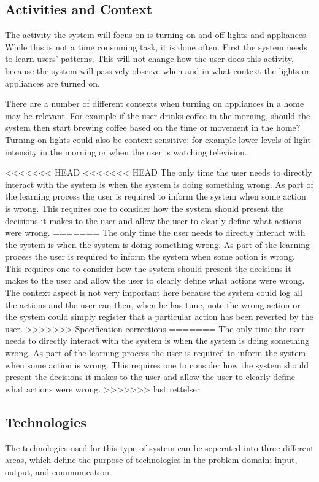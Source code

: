 \subsection{Activities and Context}
The activity the system will focus on is turning on and off lights and
appliances. While this is not a time consuming task, it is done often. First the
system needs to learn users' patterns. This will not change how the user does
this activity, because the system will passively observe when and in what
context the lights or appliances are turned on.

There are a number of different
contexts when turning on appliances in a home may be relevant.
For example if the user drinks coffee in the morning, should the system then
start brewing coffee based on the time or movement in the home? Turning on
lights could also be context sensitive; for example lower levels of light
intensity in the morning or when the user is watching television.

<<<<<<< HEAD
<<<<<<< HEAD
The only time the user needs to directly interact with the system is when the system is doing something wrong. As part of the learning process the user is required to inform the system when some action is wrong. This requires one to consider how the system should present the decisions it makes to the user and allow the user to clearly define what actions were wrong.
=======
The only time the user needs to directly interact with the system is when the system is doing something wrong. As part of the learning process the user is required to inform the system when some action is wrong. This requires one to consider how the system should present the decisions it makes to the user and allow the user to clearly define what actions were wrong. The context aspect is not very important here because the system could log all the actions and the user can then, when he has time, note the wrong action or the system could simply register that a particular action has been reverted by the user. 
>>>>>>> Specification corrections
=======
The only time the user needs to directly interact with the system is when the system is doing something wrong. As part of the learning process the user is required to inform the system when some action is wrong. This requires one to consider how the system should present the decisions it makes to the user and allow the user to clearly define what actions were wrong.
>>>>>>> last rettelser

\subsection{Technologies}
\label{sub:Technologies}
The technologies used for this type of system can be seperated into three different areas, which define the purpose of technologies in the problem domain; input, output, and communication.
